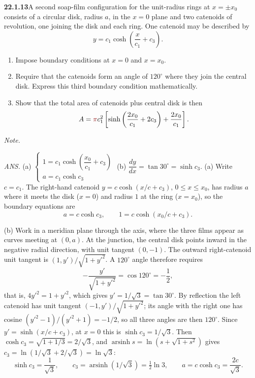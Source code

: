 \par\bigskip
\noindent\textbf{22.1.13}\quad A second soap-film configuration
for the unit-radius rings at $x=\pm x_{0}$ consists of a circular
disk, radius $a$, in the $x=0$ plane and two catenoids of
revolution, one joining the disk and each ring. One catenoid may
be described by
\[
y=c_{1}\cosh\left(\frac{x}{c_{1}}+c_{3}\right).
\]
\begin{enumerate}
\item[(a)] Impose boundary conditions at $x=0$ and $x=x_{0}$.
\item[(b)] Require that the catenoids form an angle of $120^{\circ}$
where they join the central disk. Express this third boundary
condition mathematically. 
\item[(c)] Show that the total area of catenoids plus central
disk is then
\[
A=\erratum{\pi}c_{1}^{2}\left[\sinh\left(\frac{2x_{0}}{c_{1}}+2c_{3}\right)
+\frac{2x_{0}}{c_{1}}\right].
\]
\end{enumerate}
\par\emph{Note.}~
\par\nobreak\hfill\emph{ANS.}\enspace
(a) $\begin{cases}
1=c_{1}\cosh\left(\dfrac{x_{0}}{c_{1}}+c_{3}\right)\\[8pt]
a=c_{1}\cosh c_{3}
\end{cases}$
\quad(b) $\dfrac{dy}{dx}=\tan30^{\circ}=\sinh c_{3}$.
\solution
(a) Write $c=c_1$. The right-hand catenoid
$y=c\cosh(x/c+c_3)$, $0\le x\le x_0$, has radius $a$ where it meets
the disk ($x=0$) and radius $1$ at the ring ($x=x_0$), so the boundary
equations are
\[
\boxed{a=c\cosh c_3,\qquad
1=c\cosh(x_0/c+c_3)}.
\]

(b) Work in a meridian plane through the axis, where the three films
appear as curves meeting at $(0,a)$. At the junction, the central disk
points inward in the negative radial direction, with unit tangent
$(0,-1)$. The outward right-catenoid unit tangent
is $(1,y')/\sqrt{1+y'^2}$. A $120^\circ$ angle therefore requires
\[
-\frac{y'}{\sqrt{1+y'^2}}=\cos120^\circ=-\frac12,
\]
that is, $4y'^2=1+y'^2$, which gives $y'=1/\sqrt3=\tan30^\circ$.
By reflection the left catenoid has unit tangent
$(-1,y')/\sqrt{1+y'^2}$; its angle with the right one has cosine
$(y'^2-1)/(y'^2+1)=-1/2$, so all three angles are then $120^\circ$.
Since $y'=\sinh(x/c+c_3)$, at $x=0$ this is $\sinh c_3=1/\sqrt3$.
Then $\cosh c_3=\sqrt{1+1/3}=2/\sqrt3$, and
$\operatorname{arsinh}s=\ln(s+\sqrt{1+s^2})$ gives
$c_3=\ln(1/\sqrt3+2/\sqrt3)=\ln\sqrt3$:
\[
\boxed{\sinh c_3=\frac1{\sqrt3},\qquad
c_3=\operatorname{arsinh}(1/\sqrt3)=\tfrac12\ln3,\qquad
a=c\cosh c_3=\frac{2c}{\sqrt3}}.
\]

